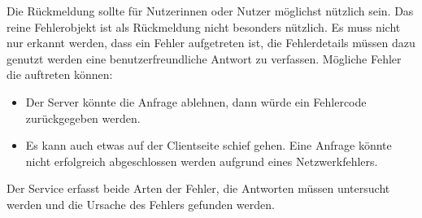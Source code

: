 Die Rückmeldung sollte für Nutzerinnen oder Nutzer möglichst nützlich sein. Das reine Fehlerobjekt ist als Rückmeldung nicht besonders nützlich. Es muss nicht nur erkannt werden, dass ein Fehler aufgetreten ist, die Fehlerdetails müssen dazu genutzt werden eine benutzerfreundliche Antwort zu verfassen. Mögliche Fehler die auftreten können:

\begin{itemize}
    \item Der Server könnte die Anfrage ablehnen, dann würde ein Fehlercode zurückgegeben werden.
    \item Es kann auch etwas auf der Clientseite schief gehen. Eine Anfrage könnte nicht erfolgreich abgeschlossen werden aufgrund eines Netzwerkfehlers.
\end{itemize}

Der Service erfasst beide Arten der Fehler, die Antworten müssen untersucht werden und die Ursache des Fehlers gefunden werden.
\cite{HttpClient}